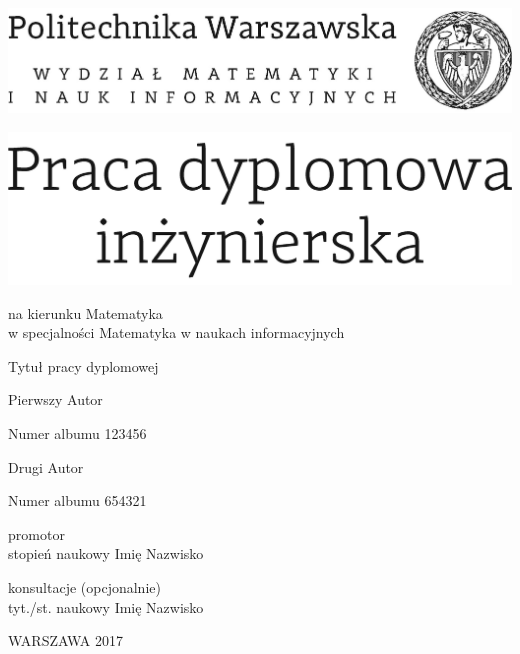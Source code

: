 \documentclass[12pt,twoside,a4paper]{article}
\newcommand{\discipline}{Matematyka}
\newcommand{\spec}{Matematyka w naukach informacyjnych} %
\renewcommand{\title}{Tytuł pracy dyplomowej}
\newcommand{\supervisor}{stopień naukowy Imię Nazwisko}
\renewcommand{\year}{2017}
\newcommand{\authori}{Pierwszy Autor}
\newcommand{\albumi}{123456}
\newcommand{\authorii}{Drugi Autor}
\newcommand{\albumii}{654321}
\begin{document}
\pagestyle{empty}

\begin{center}

\includegraphics[scale=1.]{img/politechnika} 
\vspace{40pt}

\includegraphics[scale=1.]{img/praca_inz}  %

{ \arial na kierunku \discipline
 \\ w specjalności \spec %

\vspace{30pt}
{\arial \large \title}

\vspace{40pt}

{\arial \huge \authori }

\vspace{5pt}

Numer albumu \albumi

\vspace {20pt}
{\arial \huge \authorii}

\vspace{5pt}

Numer albumu \albumii

\vspace{40pt}

promotor \\
{\arial \supervisor}

\vspace{15pt}
 
konsultacje (opcjonalnie)  \\
{\arial tyt./st. naukowy Imię Nazwisko }

 \vfill
WARSZAWA \year \\
}
\end{center}


%
%
\end{document}
